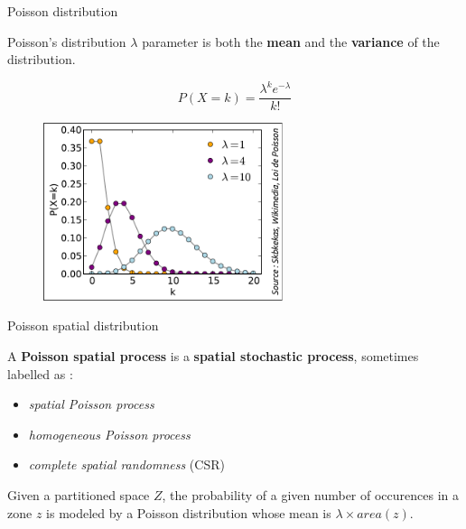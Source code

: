 \begin{frame}{Poisson distribution}

Poisson's distribution $\lambda$ parameter is both the \textbf{mean} and the \textbf{variance} of the distribution.

\begin{equation}
\nonumber
P(X = k) = \frac{\lambda^k e^{-\lambda}}{k!}
\end{equation}


\begin{figure}
  \includegraphics[width=7cm]{Poisson.pdf}
\end{figure}

\end{frame}



\begin{frame}{Poisson spatial distribution}

A \textbf{Poisson spatial process} is a \textbf{spatial stochastic process}, sometimes labelled as :

\begin{itemize}
  \item \textit{spatial Poisson process}
  \item \textit{homogeneous Poisson process}
  \item \textit{complete spatial randomness} (CSR)
\end{itemize}

Given a partitioned space $Z$, the probability of a given number of occurences in a zone $z$ is modeled by a Poisson distribution whose mean is  $\lambda \times area(z)$.

\end{frame}


